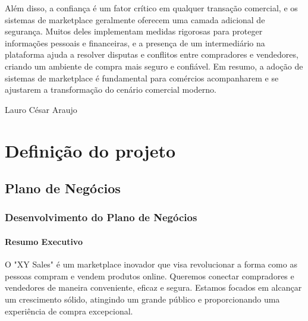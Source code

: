 \documentclass[
	12pt,				%
	openright,			%
	twoside,			%
	a4paper,			%
	english,			%
	brazil				%
	]{abntex2}
\begin{document}
Além disso, a confiança é um fator crítico em qualquer transação comercial, e os sistemas de marketplace geralmente oferecem uma camada adicional de segurança. Muitos deles implementam medidas rigorosas para proteger informações pessoais e financeiras, e a presença de um intermediário na plataforma ajuda a resolver disputas e conflitos entre compradores e vendedores, criando um ambiente de compra mais seguro e confiável. Em resumo, a adoção de sistemas de marketplace é fundamental para comércios acompanharem e se ajustarem a transformação do cenário comercial moderno.


Lauro César Araujo

\part{Definição do projeto}



\chapter{Plano de Negócios}\label{cap_plano_de_negocios}

\section{Desenvolvimento do Plano de Negócios}

\subsection{Resumo Executivo}

O "XY Sales" é um marketplace inovador que visa revolucionar a forma como as pessoas compram e vendem produtos online. Queremos conectar compradores e vendedores de maneira conveniente, eficaz e segura. Estamos focados em alcançar um crescimento sólido, atingindo um grande público e proporcionando uma experiência de compra excepcional.
\end{document}
